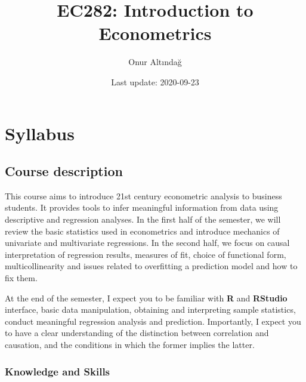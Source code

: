 \documentclass[
]{book}
\title{EC282: Introduction to Econometrics}
\author{Onur Altındağ}
\date{Last update: 2020-09-23}
\begin{document}
\maketitle

{
\setcounter{tocdepth}{1}
\tableofcontents
}
\hypertarget{syllabus}{%
\chapter*{Syllabus}\label{syllabus}}

\hypertarget{course-desctiption}{%
\section*{Course description}\label{course-desctiption}}

This course aims to introduce 21st century econometric analysis to business students. It provides tools to infer meaningful information from data using descriptive and regression analyses. In the first half of the semester, we will review the basic statistics used in econometrics and introduce mechanics of univariate and multivariate regressions. In the second half, we focus on causal interpretation of regression results, measures of fit, choice of functional form, multicollinearity and issues related to overfitting a prediction model and how to fix them.

At the end of the semester, I expect you to be familiar with \textbf{R} and \textbf{RStudio} interface, basic data manipulation, obtaining and interpreting sample statistics, conduct meaningful regression analysis and prediction. Importantly, I expect you to have a clear understanding of the distinction between correlation and causation, and the conditions in which the former implies the latter.

\hypertarget{knowledge}{%
\subsection*{Knowledge and Skills}\label{knowledge}}
\end{document}
